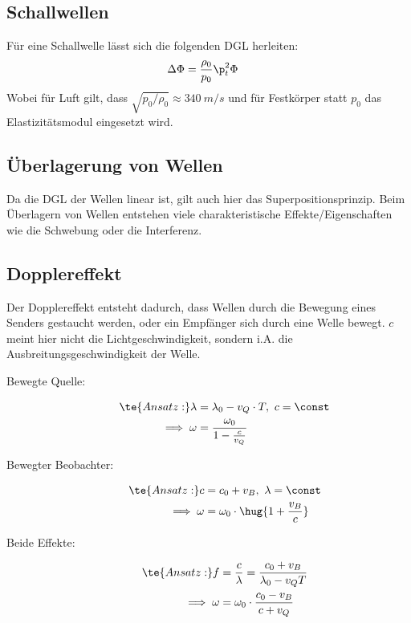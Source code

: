 \documentclass[twocolumn, bfvec]{summery_5.0}
\begin{document}
\subsection{Schallwellen}
Für eine Schallwelle lässt sich die folgenden DGL herleiten:
\begin{align*}
    \Delta \Phi &= \frac{\rho_0}{p_0} \p_t^2 \Phi
\end{align*}
Wobei für Luft gilt, dass \(\sqrt{p_0/\rho_0} \approx \SI{340}{m/s}\)
und für Festkörper statt \(p_0\) das Elastizitätsmodul eingesetzt wird. 

\subsection{Überlagerung von Wellen}
Da die DGL der Wellen linear ist, gilt auch hier das Superpositionsprinzip. Beim Überlagern von Wellen entstehen viele charakteristische Effekte/Eigenschaften wie die Schwebung oder die Interferenz.

\subsection{Dopplereffekt}
Der Dopplereffekt entsteht dadurch, dass Wellen durch die Bewegung eines Senders gestaucht werden, oder ein Empfänger sich durch eine Welle bewegt. $c$ meint hier nicht die Lichtgeschwindigkeit, sondern i.A. die Ausbreitungsgeschwindigkeit der Welle. 

\begin{description}
    \item[Bewegte Quelle:] 
    \begin{align*}
        \te{Ansatz: } \lambda &= \lambda_0 - v_Q\cdot T, \ c=\const\\
        \implies  \omega &= \frac{\omega_0}{1-\frac c{v_Q}}
    \end{align*}
    \item[Bewegter Beobachter:] 
    \begin{align*}
        \te{Ansatz: } c &= c_0 + v_B, \ \lambda=\const\\
        \implies  \omega &= \omega_0 \cdot \hug{1+\frac{v_B}c}
    \end{align*}
    \item[Beide Effekte:]
    \begin{align*}
        \te{Ansatz: } f &= \frac{c}{\lambda} = \frac{c_0 + v_B}{\lambda_0 - v_Q T}\\
        \implies \omega &= \omega_0 \cdot \frac{c_0-v_B}{c+v_Q}
    \end{align*}
\end{description}
\end{document}
